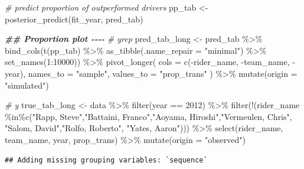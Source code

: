 \documentclass[
]{article}
\newenvironment{Shaded}{\begin{snugshade}}{\end{snugshade}}
\newcommand{\AttributeTok}[1]{\textcolor[rgb]{0.77,0.63,0.00}{#1}}
\newcommand{\CommentTok}[1]{\textcolor[rgb]{0.56,0.35,0.01}{\textit{#1}}}
\newcommand{\DecValTok}[1]{\textcolor[rgb]{0.00,0.00,0.81}{#1}}
\newcommand{\DocumentationTok}[1]{\textcolor[rgb]{0.56,0.35,0.01}{\textbf{\textit{#1}}}}
\newcommand{\FunctionTok}[1]{\textcolor[rgb]{0.00,0.00,0.00}{#1}}
\newcommand{\NormalTok}[1]{#1}
\newcommand{\OtherTok}[1]{\textcolor[rgb]{0.56,0.35,0.01}{#1}}
\newcommand{\SpecialCharTok}[1]{\textcolor[rgb]{0.00,0.00,0.00}{#1}}
\newcommand{\StringTok}[1]{\textcolor[rgb]{0.31,0.60,0.02}{#1}}
\begin{document}
\begin{Shaded}
\begin{Highlighting}[]
\CommentTok{\# predict proportion of outperformed drivers}
\NormalTok{pp\_tab }\OtherTok{\textless{}{-}} \FunctionTok{posterior\_predict}\NormalTok{(fit\_year, pred\_tab)}

\DocumentationTok{\#\# Proportion plot {-}{-}{-}{-}}
\CommentTok{\# yrep}
\NormalTok{pred\_tab\_long }\OtherTok{\textless{}{-}}
\NormalTok{  pred\_tab }\SpecialCharTok{\%\textgreater{}\%}
  \FunctionTok{bind\_cols}\NormalTok{(}\FunctionTok{t}\NormalTok{(pp\_tab) }\SpecialCharTok{\%\textgreater{}\%} \FunctionTok{as\_tibble}\NormalTok{(}\AttributeTok{.name\_repair =} \StringTok{"minimal"}\NormalTok{) }\SpecialCharTok{\%\textgreater{}\%} 
  \FunctionTok{set\_names}\NormalTok{(}\DecValTok{1}\SpecialCharTok{:}\DecValTok{10000}\NormalTok{)) }\SpecialCharTok{\%\textgreater{}\%}
  \FunctionTok{pivot\_longer}\NormalTok{(}
    \AttributeTok{cols      =} \FunctionTok{c}\NormalTok{(}\SpecialCharTok{{-}}\NormalTok{rider\_name, }\SpecialCharTok{{-}}\NormalTok{team\_name, }\SpecialCharTok{{-}}\NormalTok{year),}
    \AttributeTok{names\_to  =} \StringTok{"sample"}\NormalTok{,}
    \AttributeTok{values\_to =} \StringTok{"prop\_trans"}
\NormalTok{  ) }\SpecialCharTok{\%\textgreater{}\%}
  \FunctionTok{mutate}\NormalTok{(}\AttributeTok{origin =} \StringTok{"simulated"}\NormalTok{)}

\CommentTok{\# y}
\NormalTok{true\_tab\_long }\OtherTok{\textless{}{-}}
\NormalTok{  data }\SpecialCharTok{\%\textgreater{}\%}
  \FunctionTok{filter}\NormalTok{(year }\SpecialCharTok{==} \DecValTok{2012}\NormalTok{) }\SpecialCharTok{\%\textgreater{}\%}
  \FunctionTok{filter}\NormalTok{(}\SpecialCharTok{!}\NormalTok{(rider\_name }\SpecialCharTok{\%in\%}\FunctionTok{c}\NormalTok{(}\StringTok{"Rapp, Steve"}\NormalTok{,}\StringTok{"Battaini, Franco"}\NormalTok{,}\StringTok{"Aoyama, Hiroshi"}\NormalTok{,}\StringTok{"Vermeulen, Chris"}\NormalTok{,}
                         \StringTok{"Salom, David"}\NormalTok{,}\StringTok{"Rolfo, Roberto"}\NormalTok{, }\StringTok{"Yates, Aaron"}\NormalTok{))) }\SpecialCharTok{\%\textgreater{}\%} 
  \FunctionTok{select}\NormalTok{(rider\_name, team\_name, year, prop\_trans) }\SpecialCharTok{\%\textgreater{}\%}
  \FunctionTok{mutate}\NormalTok{(}\AttributeTok{origin =} \StringTok{"observed"}\NormalTok{)}
\end{Highlighting}
\end{Shaded}

\begin{verbatim}
## Adding missing grouping variables: `sequence`
\end{verbatim}
\end{document}
